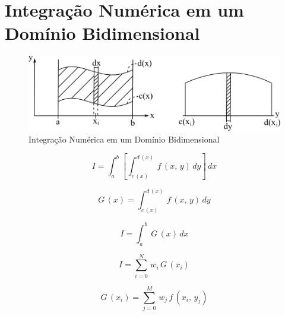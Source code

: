 \section{Integração Numérica em um Domínio Bidimensional}

\begin{figure}[htb]
 \centering
 \includegraphics[scale=1.0]{capitulos/capitulo2/figuras/int_num_dom_bid1.png}
 \caption{Integração Numérica em um Domínio Bidimensional}
 \label{fig:int_num_dom_bid1}
\end{figure}

\begin{equation}
 \label{cap2:sec9:eq1}
 I = \int_a^b \left[ \int_{c\,(x)}^{d\,(x)} \, f\,(x,\,y) \, dy \right] \, dx
\end{equation}

\begin{equation}
 \label{cap2:sec9:eq2}
 G\,(x) = \int_{c\,(x)}^{d\,(x)} \, f\,(x,\,y) \, dy
\end{equation}

\begin{equation}
 \label{cap2:sec9:eq3}
 I = \int_a^b \, G\,(x) \, dx
\end{equation}

\begin{equation}
 \label{cap2:sec9:eq4}
 I = \sum_{i = 0}^N \, w_i \, G\,(x_i)
\end{equation}

\begin{equation}
 \label{cap2:sec9:eq5}
 G\,(x_i) = \sum_{j = 0}^M \, w_j \, f\,(x_i,\,y_j)
\end{equation}

